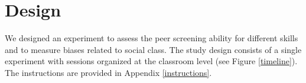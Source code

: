 \documentclass[11pt,a4paper,oneside]{article}
\begin{document}




\section{Design} \label{s3}
We designed an experiment to assess the peer screening ability for different skills and to measure biases related to social class. The study design consists of a single experiment with sessions organized at the classroom level (see Figure \ref{timeline}). The instructions are provided in Appendix \ref{instructions}. 
\end{document}
